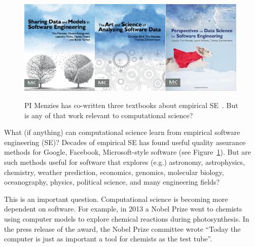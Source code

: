 \documentclass{NSF}
\newcommand{\fig}[1]{Figure~\ref{fig:#1}}
\begin{document}
\begin{nsfdescription}
\begin{figure}
\includegraphics[width=1.45in]{fig/book1.png}\includegraphics[width=1.45in]{fig/book2.png}\includegraphics[width=1.45in]{fig/book3.jpg}
\caption{PI Menzies has co-written    three textbooks about 
empirical SE~\cite{menzies2014sharing,bird2015art,menzies2016perspectives}. But is any of that work relevant to
 computational science?}\label{fig:books}
\end{figure}
What (if anything) can computational science
learn from  empirical software engineering (SE)? 
 Decades  of 
     empirical SE has found
      useful   quality assurance methods for Google, Facebook,
Microsoft-style software (see \fig{books}). 
But are such methods useful for software that explores (e.g.) 
astronomy,  astrophysics,  chemistry,   weather prediction, economics, genomics, molecular biology,  oceanography,  physics,  political  science,  and  many engineering fields?

This is an important question.
Computational science is becoming
more dependent on 
software.
For example, in 2013 a Nobel Prize went to chemists using computer
models to explore    chemical reactions during photosynthesis. In the press release of the award,
the Nobel Prize committee wrote ``Today the computer is just as important a tool for chemists as the  test
tube''. 


\end{nsfdescription}
\end{document}
